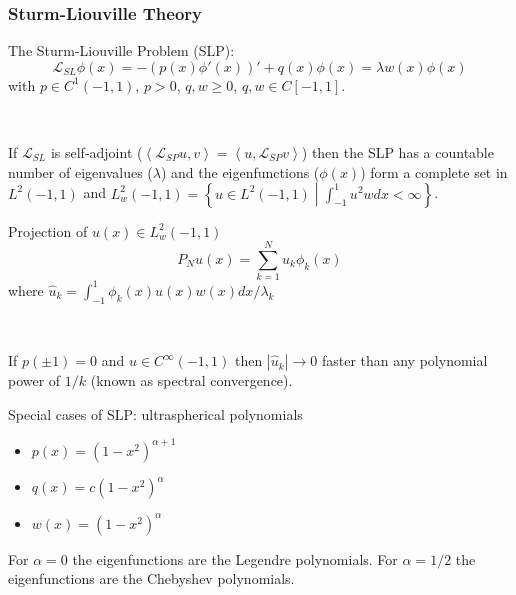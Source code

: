 \documentclass{beamer}
\newcommand{\abs}[1]{\left \vert #1 \right \vert}
\newcommand{\Set}[2]{\left \{ #1 \middle \vert #2 \right \}}
\newcommand{\inner}[2]{\left \langle #1, #2 \right \rangle}
\begin{document}
\begin{frame}

\frametitle{Sturm-Liouville Theory}

The Sturm-Liouville Problem (SLP):
\begin{equation*}
\mathcal{L}_{SL} \phi(x) = -\left ( p(x) \phi'(x) \right )' + q(x) \phi(x) = \lambda w(x) \phi(x)
\end{equation*}
with $p \in C^1(-1,1)$, $p>0$, $q, w \geq 0$, $q, w \in C[-1,1]$.

~

If $\mathcal{L}_{SL}$ is self-adjoint ($\inner{\mathcal{L}_{SP}u}{v} = \inner{u}{\mathcal{L}_{SP}v}$) then the SLP has a countable number of eigenvalues ($\lambda$) and the eigenfunctions ($\phi(x)$) form a complete set in $L^2(-1,1)$ and $L_w^2(-1,1) = \Set{u \in L^2(-1,1)}{\int_{-1}^1 u^2 w dx < \infty}$.
\end{frame}

\begin{frame}

\begin{block}{Projection of $u(x) \in L_w^2(-1,1)$}
\begin{equation*}
P_N u(x) = \sum_{k=1}^N \hat{u}_k \phi_k(x)
\end{equation*}
where $\hat{u}_k = \int_{-1}^1 \phi_k(x) u(x) w(x) dx / \lambda_k$
\end{block}

~

If $p(\pm 1) = 0$ and $u \in C^\infty(-1,1)$ then $\abs{\hat{u}_k} \to 0$ faster than any polynomial power of $1/k$ (known as spectral convergence).

\end{frame}

\begin{frame}

Special cases of SLP: ultraspherical polynomials
\begin{itemize}
\item $p(x) = (1-x^2)^{\alpha+1}$
\item $q(x) =c(1-x^2)^\alpha$
\item $w(x) = (1-x^2)^\alpha$
\end{itemize}
For $\alpha = 0$ the eigenfunctions are the Legendre polynomials.
For $\alpha = 1/2$ the eigenfunctions are the Chebyshev polynomials.

\end{frame}
\end{document}
